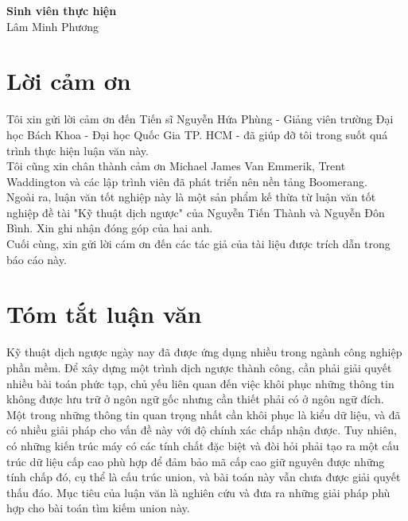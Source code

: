 \documentclass[12pt]{report}
\begin{document}
	\hspace*{8cm}\textbf{Sinh viên thực hiện}
	\\[10ex]
	\hspace*{9cm}Lâm Minh Phương
		
	\chapter*{Lời cảm ơn}
	Tôi xin gửi lời cảm ơn đến Tiến sĩ Nguyễn Hứa Phùng - Giảng viên trường Đại học Bách Khoa - Đại học Quốc Gia TP. HCM - đã giúp đỡ tôi trong suốt quá trình thực hiện luận văn này.\\
	Tôi cũng xin chân thành cảm ơn Michael James Van Emmerik, Trent Waddington và các lập trình viên đã phát triển nên nền tảng Boomerang.\\
	Ngoài ra, luận văn tốt nghiệp này là một sản phẩm kế thừa từ luận văn tốt nghiệp đề tài "Kỹ thuật dịch ngược" của Nguyễn Tiến Thành và Nguyễn Đôn Bình. Xin ghi nhận đóng góp của hai anh.\\
	Cuối cùng, xin gửi lời cám ơn đến các tác giả của tài liệu được trích dẫn trong báo cáo này. \cite{boomeranghomepage}
	
	\newpage
	\chapter*{Tóm tắt luận văn}
	Kỹ thuật dịch ngược ngày nay đã được ứng dụng nhiều trong ngành công nghiệp phần mềm. Để xây dựng một trình dịch ngược thành công, cần phải giải quyết nhiều bài toán phức tạp, chủ yếu liên quan đến việc khôi phục những thông tin không được lưu trữ ở ngôn ngữ gốc nhưng cần thiết phải có ở ngôn ngữ đích. Một trong những thông tin quan trọng nhất cần khôi phục là kiểu dữ liệu, và đã có nhiều giải pháp cho vấn đề này với độ chính xác chấp nhận được. Tuy nhiên, có những kiến trúc máy có các tính chất đặc biệt và đòi hỏi phải tạo ra một cấu trúc dữ liệu cấp cao phù hợp để đảm bảo mã cấp cao giữ nguyên được những tính chấp đó, cụ thể là cấu trúc union, và bài toán này vẫn chưa được giải quyết thấu đáo. Mục tiêu của luận văn là nghiên cứu và đưa ra những giải pháp phù hợp cho bài toán tìm kiếm union này.
	
	
	\newpage
	\tableofcontents
	
	\newpage
	\listoffigures
	
	\newpage
	\lstlistoflistings
	
	\newpage
	
	
	
	
	
	
	
	\newpage
	\nocite{*}
	\printbibliography
\end{document}
